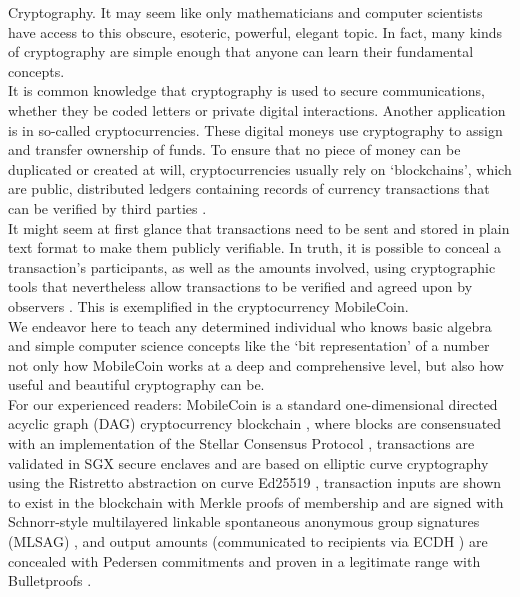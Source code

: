

Cryptography. It may seem like only mathematicians and computer scientists have access to this obscure, esoteric, powerful, elegant topic. In fact, many kinds of cryptography are simple enough that anyone can learn their fundamental concepts.
\\ \newline
It is common knowledge that cryptography is used to secure communications, whether they be coded letters or private digital interactions. Another application is in so-called cryptocurrencies. These digital moneys use cryptography to assign and transfer ownership of funds. To ensure that no piece of money can be duplicated or created at will, cryptocurrencies usually rely on `blockchains', which are public, distributed ledgers containing records of currency transactions that can be verified by third parties \cite{Nakamoto_bitcoin}.
\\ \newline
It might seem at first glance that transactions need to be sent and stored in plain text format to make them publicly verifiable. In truth, it is possible to conceal a transaction's participants, as well as the amounts involved, using cryptographic tools that nevertheless allow transactions to be verified and agreed upon by observers \cite{cryptoNoteWhitePaper}. This is exemplified in the cryptocurrency MobileCoin.
\\ \newline
We endeavor here to teach any determined individual who knows basic algebra and simple computer science concepts like the `bit representation' of a number not only how MobileCoin works at a deep and comprehensive level, but also how useful and beautiful cryptography can be.
\\ \newline
For our experienced readers: MobileCoin is a standard one-dimensional directed acyclic graph (DAG) cryptocurrency blockchain \cite{Nakamoto_bitcoin}, where blocks are consensuated with an implementation of the Stellar Consensus Protocol \cite{stellar-consensus-protocol}, transactions are validated in SGX secure enclaves \cite{intel-sgx-explained-advanced} and are based on elliptic curve cryptography using the Ristretto abstraction \cite{ristretto} on curve Ed25519 \cite{Bernstein2012-high-speed-high-security-ed25519}, transaction inputs are shown to exist in the blockchain with Merkle proofs of membership \cite{merkle-tree} and are signed with Schnorr-style multilayered linkable spontaneous anonymous group signatures (MLSAG) \cite{MRL-0005-ringct}, and output amounts (communicated to recipients via ECDH \cite{Diffie-Hellman}) are concealed with Pedersen commitments \cite{maxwell-ct-2} and proven in a legitimate range with Bulletproofs \cite{Bulletproofs_paper}.